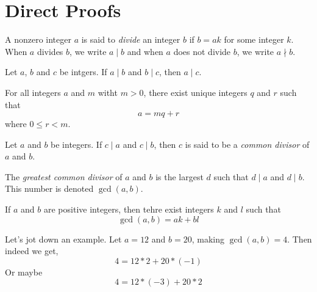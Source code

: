 \chapter{Direct Proofs}

\begin{definition}
	\label{div}
	A nonzero integer $a$ is said to \emph{divide} an integer $b$ if $b = ak$ for some integer $k$. When $a$ divides $b$, we write $a \mid b$ and when $a$ does not divide $b$, we write $a \nmid b$.
\end{definition}

\begin{proposition} \label{transdiv}
	Let $a$, $b$ and $c$ be intgers. If $a \mid b$ and $b \mid c$, then $a \mid c$.
\end{proposition}

\begin{theorem} \label{divalgo}
	For all integers $a$ and $m$ witht $m > 0$, there exist unique integers $q$ and $r$ such that 
	$$a = mq+r$$
	where $0 \leq r < m$.
\end{theorem}

\begin{definition}
	Let $a$ and $b$ be integers. If $c \mid a$ and $c \mid b$, then $c$ is said to be a \emph{common divisor} of $a$ and $b$.

	The \emph{greatest common divisor} of $a$ and $b$ is the largest $d$ such that $d \mid a$ and $d \mid b$. This number is denoted $\gcd(a,b)$.
\end{definition}

\begin{theorem}
	If $a$ and $b$ are positive integers, then tehre exist integers $k$ and $l$ such that $$\gcd(a,b) = ak + bl$$
\end{theorem}

\begin{scratch}
Let's jot down an example. Let $a = 12$ and $b = 20$, making $\gcd(a, b) = 4$.
Then indeed we get, $$4 = 12*2 + 20*(-1)$$
Or maybe $$4 = 12*(-3) + 20*2$$
\end{scratch}

